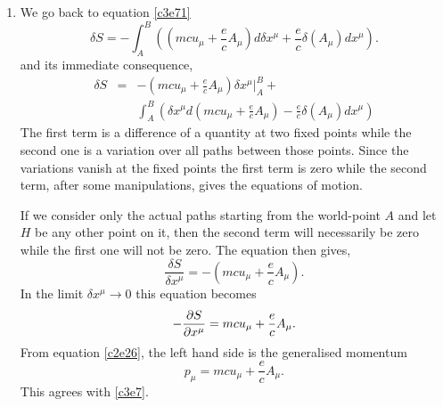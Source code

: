 \begin{enumerate}
\item We go back to equation \eqref{c3e71}
\[
\delta S = -\int_A^B\left((mcu_\mu + \frac{e}{c}A_\mu)d\delta x^\mu + \frac{e}{c}\delta(A_\mu) dx^\mu\right).
\]
and its immediate consequence,
\begin{eqnarray*}
\delta S &=& -\left(mcu_\mu + \frac{e}{c}A_\mu\right)\delta x^\mu\big|_A^B + \\
  & & \int_A^B \left(\delta x^\mu d\left(mcu_\mu + \frac{e}{c}A_\mu\right) - 
 \frac{e}{c}\delta(A_\mu) dx^\mu\right)
\end{eqnarray*}
The first term is a difference of a quantity at two fixed points while the second
one is a variation over all paths between those points. Since the variations 
vanish at the fixed points the first term is zero while the second term, after some
manipulations, gives the equations of motion.

If we consider only the actual paths starting from the world-point $A$ and let $H$
be any other point on it, then the second term will necessarily be zero while the 
first one will not be zero. The equation then gives,
\[
\frac{\delta S}{\delta x^\mu} = -\left(mcu_\mu + \frac{e}{c}A_\mu\right).
\]
In the limit $\delta x^\mu \rightarrow 0$ this equation becomes
\begin{equation}\label{c3e78}
-\frac{\partial{S}}{\partial{x^\mu}} = mcu_\mu + \frac{e}{c}A_\mu.
\end{equation}
From equation \eqref{c2e26}, the left hand side is the generalised momentum
\begin{equation}\label{c3e79}
p_\mu = mcu_\mu + \frac{e}{c}A_\mu.
\end{equation}
This agrees with \eqref{c3e7}.


\end{enumerate}

